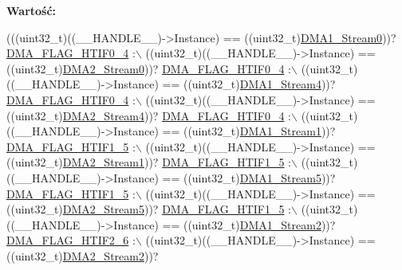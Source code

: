 {\bfseries Wartość\+:}
\begin{DoxyCode}
(((uint32\_t)((\_\_HANDLE\_\_)->Instance) == ((uint32\_t)\hyperlink{group___peripheral__declaration_ga61247dd5d594289c404dd8774202dfd8}{DMA1\_Stream0}))? 
      \hyperlink{group___d_m_a__flag__definitions_ga976fee242270824013f1fc0b6bd4c446}{DMA\_FLAG\_HTIF0\_4} :\(\backslash\)
 ((uint32\_t)((\_\_HANDLE\_\_)->Instance) == ((uint32\_t)\hyperlink{group___peripheral__declaration_ga3a2efe5fd7a7a79be3b08a1670bbd016}{DMA2\_Stream0}))? 
      \hyperlink{group___d_m_a__flag__definitions_ga976fee242270824013f1fc0b6bd4c446}{DMA\_FLAG\_HTIF0\_4} :\(\backslash\)
 ((uint32\_t)((\_\_HANDLE\_\_)->Instance) == ((uint32\_t)\hyperlink{group___peripheral__declaration_ga87df45f4b82e0b3a8c1b17f1a77aecdb}{DMA1\_Stream4}))? 
      \hyperlink{group___d_m_a__flag__definitions_ga976fee242270824013f1fc0b6bd4c446}{DMA\_FLAG\_HTIF0\_4} :\(\backslash\)
 ((uint32\_t)((\_\_HANDLE\_\_)->Instance) == ((uint32\_t)\hyperlink{group___peripheral__declaration_gae32674772021620800275dd3b6d62c2f}{DMA2\_Stream4}))? 
      \hyperlink{group___d_m_a__flag__definitions_ga976fee242270824013f1fc0b6bd4c446}{DMA\_FLAG\_HTIF0\_4} :\(\backslash\)
 ((uint32\_t)((\_\_HANDLE\_\_)->Instance) == ((uint32\_t)\hyperlink{group___peripheral__declaration_gaf7d82f110f19982d483eebc465d222b2}{DMA1\_Stream1}))? 
      \hyperlink{group___d_m_a__flag__definitions_ga2c9522a20a6ace45958413034b7f3af8}{DMA\_FLAG\_HTIF1\_5} :\(\backslash\)
 ((uint32\_t)((\_\_HANDLE\_\_)->Instance) == ((uint32\_t)\hyperlink{group___peripheral__declaration_gae96f15d34d3c41c16fce69bc2878151a}{DMA2\_Stream1}))? 
      \hyperlink{group___d_m_a__flag__definitions_ga2c9522a20a6ace45958413034b7f3af8}{DMA\_FLAG\_HTIF1\_5} :\(\backslash\)
 ((uint32\_t)((\_\_HANDLE\_\_)->Instance) == ((uint32\_t)\hyperlink{group___peripheral__declaration_gac3abc20f80e25c19b02104ad34eae652}{DMA1\_Stream5}))? 
      \hyperlink{group___d_m_a__flag__definitions_ga2c9522a20a6ace45958413034b7f3af8}{DMA\_FLAG\_HTIF1\_5} :\(\backslash\)
 ((uint32\_t)((\_\_HANDLE\_\_)->Instance) == ((uint32\_t)\hyperlink{group___peripheral__declaration_gac40f58718761251875b5a897287efd83}{DMA2\_Stream5}))? 
      \hyperlink{group___d_m_a__flag__definitions_ga2c9522a20a6ace45958413034b7f3af8}{DMA\_FLAG\_HTIF1\_5} :\(\backslash\)
 ((uint32\_t)((\_\_HANDLE\_\_)->Instance) == ((uint32\_t)\hyperlink{group___peripheral__declaration_gad0e2140b8eeec3594035f1a7bf2a7250}{DMA1\_Stream2}))? 
      \hyperlink{group___d_m_a__flag__definitions_ga2ae0054d63c453a14b6d3822c503e7b4}{DMA\_FLAG\_HTIF2\_6} :\(\backslash\)
 ((uint32\_t)((\_\_HANDLE\_\_)->Instance) == ((uint32\_t)\hyperlink{group___peripheral__declaration_ga71bb410664b861ff0520f08976e24ee1}{DMA2\_Stream2}))? 

\end{DoxyCode}
